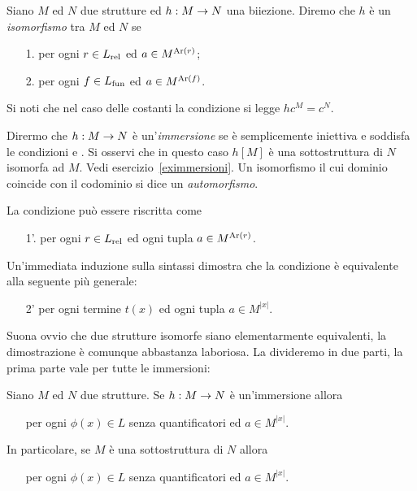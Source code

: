 \begin{definition}\label{isomorfismodef}
Siano $M$ ed $N$ due strutture ed $h:M\rightarrow N$ una biiezione. Diremo che $h$ \`e un \emph{isomorfismo\/} tra $M$ ed $N$ se
\begin{itemize}
\item[1.] per ogni $r\in L_{\rm rel}$ ed $a\in M^{{\rm Ar}(r)}$;
\item[2.] per ogni $f\in L_{\rm fun}$ ed $a\in M^{{\rm Ar}(f)}$.
\end{itemize}
Si noti che nel caso delle costanti la condizione  si legge $hc^M=c^N$. 

Dirermo che $h:M\rightarrow N$ \`e un'\emph{immersione\/} se \`e semplicemente iniettiva e soddisfa le condizioni  e . Si osservi che in questo caso $h[M]$ \`e una sottostruttura di $N$ isomorfa ad $M$. Vedi esercizio~\ref{eximmersioni}. Un isomorfismo il cui dominio coincide con il codominio si dice un \emph{automorfismo}.
\end{definition}

La condizione  pu\`o essere riscritta come
\begin{itemize}
\item[1'.] per ogni $r\in L_{\rm rel}$ ed ogni tupla $a\in M^{{\rm Ar}(r)}$.
\end{itemize}
Un'immediata induzione sulla sintassi dimostra che la condizione  \`e equivalente alla seguente pi\`u generale:
\begin{itemize}
\item[2'] per ogni termine $t(x)$ ed ogni tupla  $a\in M^{|x|}$.
\end{itemize}

Suona ovvio che due strutture isomorfe siano elementarmente equivalenti, la dimostrazione \`e comunque abbastanza laboriosa. La divideremo in due parti, la prima parte vale per tutte le immersioni:

\begin{lemma}\label{immersioniqfeq}
Siano $M$ ed $N$ due strutture. Se $h:M\rightarrow N$ \`e un'immersione allora 
\begin{itemize}
\item[] per ogni $\phi(x)\in L$ senza quantificatori ed $a\in M^{|x|}$.
\end{itemize}
In particolare, se $M$ \`e una sottostruttura di $N$ allora  
\begin{itemize}
\item[] per ogni $\phi(x)\in L$ senza quantificatori ed $a\in M^{|x|}$.
\end{itemize}
\end{lemma}
 

